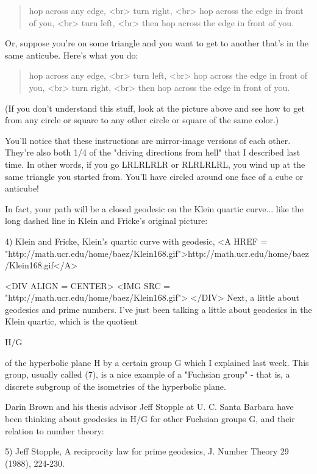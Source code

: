 \begin{quote}
hop across any edge, <br>
turn right, <br>
hop across the edge in front of you, <br>
turn left, <br>
then hop across the edge in front of you.  

\end{quote}
Or, suppose you're on some triangle and you want to get to another
that's in the same anticube.  Here's what you do:

\begin{quote}
hop across any edge, <br>
turn left, <br>
hop across the edge in front of you, <br>
turn right, <br>
then hop across the edge in front of you.  
 
\end{quote}
(If you don't understand this stuff, look at the picture above and 
see how to get from any circle or square to any other circle or 
square of the same color.) 

You'll notice that these instructions are mirror-image versions of 
each other.  They're also both 1/4 of the "driving directions from 
hell" that I described last time.  In other words, if you go 
LRLRLRLR or RLRLRLRL, you wind up at the same triangle you started
from.  You'll have circled around one face of a cube or anticube!

In fact, your path will be a closed geodesic on the Klein quartic 
curve... like the long dashed line in Klein and Fricke's original 
picture:

4) Klein and Fricke, Klein's quartic curve with geodesic,
<A HREF = "http://math.ucr.edu/home/baez/Klein168.gif">http://math.ucr.edu/home/baez/Klein168.gif</A>

<DIV ALIGN = CENTER>
<IMG SRC = "http://math.ucr.edu/home/baez/Klein168.gif">
</DIV>
Next, a little about geodesics and prime numbers.   I've just been
talking a little about geodesics in the Klein quartic, which is the
quotient 

H/G

of the hyperbolic plane H by a certain group G which I explained  
last week.  This group, usually called \Gamma (7), is a nice example 
of a "Fuchsian group" - that is, a discrete subgroup of the isometries
of the hyperbolic plane.  

Darin Brown and his thesis advisor Jeff Stopple at U. C. Santa
Barbara have been thinking about geodesics in H/G for other Fuchsian
groups G, and their relation to number theory:

5) Jeff Stopple, A reciprocity law for prime geodesics, J. Number 
Theory 29 (1988), 224-230.

